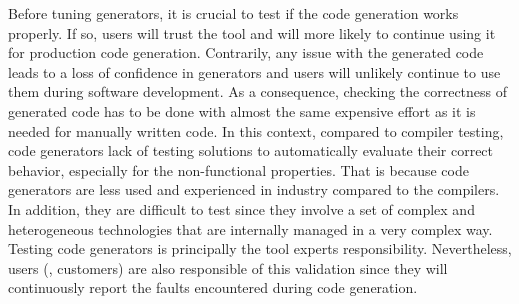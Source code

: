 
Before tuning generators, it is crucial to test if the code generation works properly. If so, users will trust the tool and will more likely to continue using it for production code generation. Contrarily, any issue with the generated code leads to a loss of confidence in generators and users will unlikely continue to use them during software development. As a consequence, checking the correctness of generated code has to be done with almost the same expensive effort as it is needed for manually written code.
In this context, compared to compiler testing\cite{yang2011finding,le2014compiler}, code generators lack of testing solutions to automatically evaluate their correct behavior, especially for the non-functional properties.
That is because code generators are less used and experienced in industry compared to the compilers. In addition, they are difficult to test since they involve a set of complex and heterogeneous technologies that are internally managed in a very complex way\cite{guana2015developers,guana2014chaintracker}.
Testing code generators is principally the tool experts responsibility. Nevertheless, users (\eg, customers) are also responsible of this validation since they will continuously report the faults encountered during code generation. 
